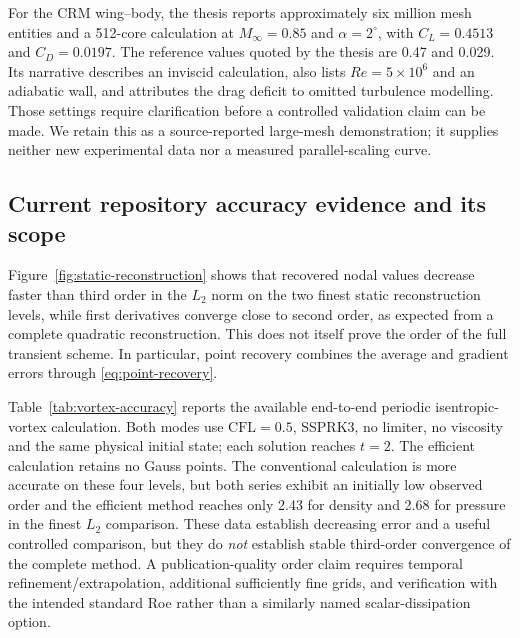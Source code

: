 \documentclass[11pt]{article}
\begin{document}
For the CRM wing--body, the thesis reports approximately six million mesh entities and a 512-core calculation at $M_\infty=0.85$ and $\alpha=2^\circ$, with $C_L=0.4513$ and $C_D=0.0197$.  The reference values quoted by the thesis are 0.47 and 0.029.  Its narrative describes an inviscid calculation, also lists $Re=5\times10^6$ and an adiabatic wall, and attributes the drag deficit to omitted turbulence modelling.  Those settings require clarification before a controlled validation claim can be made.  We retain this as a source-reported large-mesh demonstration; it supplies neither new experimental data nor a measured parallel-scaling curve.

\subsection{Current repository accuracy evidence and its scope}\label{sec:accuracy}

Figure~\ref{fig:static-reconstruction} shows that recovered nodal values decrease faster than third order in the $L_2$ norm on the two finest static reconstruction levels, while first derivatives converge close to second order, as expected from a complete quadratic reconstruction.  This does not itself prove the order of the full transient scheme.  In particular, point recovery combines the average and gradient errors through \eqref{eq:point-recovery}.

Table~\ref{tab:vortex-accuracy} reports the available end-to-end periodic isentropic-vortex calculation.  Both modes use $\mathrm{CFL}=0.5$, SSPRK3, no limiter, no viscosity and the same physical initial state; each solution reaches $t=2$.  The efficient calculation retains no Gauss points.  The conventional calculation is more accurate on these four levels, but both series exhibit an initially low observed order and the efficient method reaches only 2.43 for density and 2.68 for pressure in the finest $L_2$ comparison.  These data establish decreasing error and a useful controlled comparison, but they do \emph{not} establish stable third-order convergence of the complete method.  A publication-quality order claim requires temporal refinement/extrapolation, additional sufficiently fine grids, and verification with the intended standard Roe rather than a similarly named scalar-dissipation option.
\end{document}
